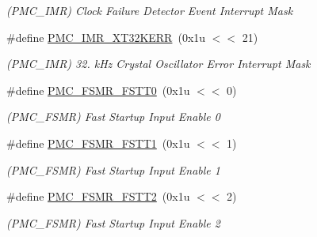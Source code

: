 \begin{DoxyCompactItemize}
\begin{DoxyCompactList}\small\item\em (P\+M\+C\+\_\+\+I\+MR) Clock Failure Detector Event Interrupt Mask \end{DoxyCompactList}\item 
\mbox{\label{group__SAMV71__PMC_gac242edfc1b1b6849dedc4287484ae341}} 
\#define \mbox{\hyperlink{group__SAMV71__PMC_gac242edfc1b1b6849dedc4287484ae341}{P\+M\+C\+\_\+\+I\+M\+R\+\_\+\+X\+T32\+K\+E\+RR}}~(0x1u $<$$<$ 21)
\begin{DoxyCompactList}\small\item\em (P\+M\+C\+\_\+\+I\+MR) 32. k\+Hz Crystal Oscillator Error Interrupt Mask \end{DoxyCompactList}\item 
\mbox{\label{group__SAMV71__PMC_ga12706f73e66ce05cbb86fcc4a90ffcb2}} 
\#define \mbox{\hyperlink{group__SAMV71__PMC_ga12706f73e66ce05cbb86fcc4a90ffcb2}{P\+M\+C\+\_\+\+F\+S\+M\+R\+\_\+\+F\+S\+T\+T0}}~(0x1u $<$$<$ 0)
\begin{DoxyCompactList}\small\item\em (P\+M\+C\+\_\+\+F\+S\+MR) Fast Startup Input Enable 0 \end{DoxyCompactList}\item 
\mbox{\label{group__SAMV71__PMC_ga9ea2a7647ca3147fd349b666b3da4a3a}} 
\#define \mbox{\hyperlink{group__SAMV71__PMC_ga9ea2a7647ca3147fd349b666b3da4a3a}{P\+M\+C\+\_\+\+F\+S\+M\+R\+\_\+\+F\+S\+T\+T1}}~(0x1u $<$$<$ 1)
\begin{DoxyCompactList}\small\item\em (P\+M\+C\+\_\+\+F\+S\+MR) Fast Startup Input Enable 1 \end{DoxyCompactList}\item 
\mbox{\label{group__SAMV71__PMC_gabfc48683196af6e41928ef97958820bc}} 
\#define \mbox{\hyperlink{group__SAMV71__PMC_gabfc48683196af6e41928ef97958820bc}{P\+M\+C\+\_\+\+F\+S\+M\+R\+\_\+\+F\+S\+T\+T2}}~(0x1u $<$$<$ 2)
\begin{DoxyCompactList}\small\item\em (P\+M\+C\+\_\+\+F\+S\+MR) Fast Startup Input Enable 2 \end{DoxyCompactList}\item 
\mbox{\label{group__SAMV71__PMC_ga209ebf830fe0d38dec72a4157c8c0285}} 

\end{DoxyCompactItemize}
